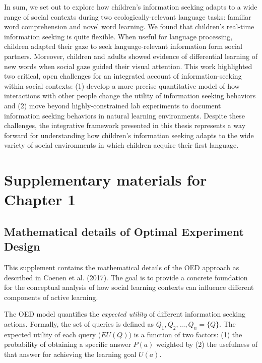 \documentclass[oneside]{report}
\begin{document}
In sum, we set out to explore how children's information seeking adapts
to a wide range of social contexts during two ecologically-relevant
language tasks: familiar word comprehension and novel word learning. We
found that children's real-time information seeking is quite flexible.
When useful for language processing, children adapted their gaze to seek
language-relevant information form social partners. Moreover, children
and adults showed evidence of differential learning of new words when
social gaze guided their visual attention. This work highlighted two
critical, open challenges for an integrated account of
information-seeking within social contexts: (1) develop a more precise
quantitative model of how interactions with other people change the
utility of information seeking behaviors and (2) move beyond
highly-constrained lab experiments to document information seeking
behaviors in natural learning environments. Despite these challenges,
the integrative framework presented in this thesis represents a way
forward for understanding how children's information seeking adapts to
the wide variety of social environments in which children acquire their
first language.

\appendix

\chapter{Supplementary materials for Chapter
1}\label{supplementary-materials-for-chapter-1}

\section{Mathematical details of Optimal Experiment
Design}\label{mathematical-details-of-optimal-experiment-design}

This supplement contains the mathematical details of the OED approach as
described in Coenen et al. (2017). The goal is to provide a concrete
foundation for the conceptual analysis of how social learning contexts
can influence different components of active learning.

The OED model quantifies the \emph{expected utility} of different
information seeking actions. Formally, the set of queries is defined as
\(Q_1, Q_2,..., Q_n = \{Q\}\). The expected utility of each query
(\(EU(Q)\)) is a function of two factors: (1) the probability of
obtaining a specific answer \(P(a)\) weighted by (2) the usefulness of
that answer for achieving the learning goal \(U(a)\).
\end{document}

